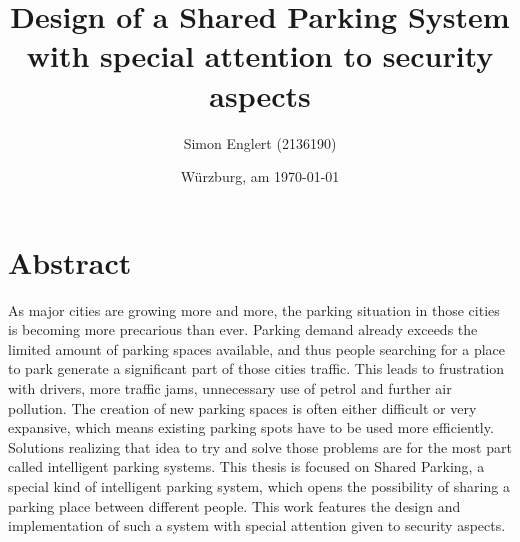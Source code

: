\documentclass[
a4paper,     %
titlepage,   %
14pt         %
]{scrartcl}  %
\title{Design of a Shared Parking System with special attention to security aspects}
\author{Simon Englert (2136190)}
\date{Würzburg, am \today{}}
\theoremstyle{mystyle}
\begin{document}

 \maketitle

 \tableofcontents



 \newpage



\section{Abstract}
As major cities are growing more and more, the parking situation in those cities is becoming more precarious than ever. Parking demand already exceeds the limited amount of parking spaces available, and thus people searching for a place to park generate a significant part of those cities traffic. This leads to frustration with drivers, more traffic jams, unnecessary use of petrol and further air pollution. The creation of new parking spaces is often either difficult or very expansive, which means existing parking spots have to be used more efficiently. Solutions realizing that idea to try and solve those problems are for the most part called intelligent parking systems. This thesis is focused on Shared Parking, a special kind of intelligent parking system, which opens the possibility of sharing a parking place between different people. This work features the design and implementation of such a system with special attention given to security aspects.
\end{document}
